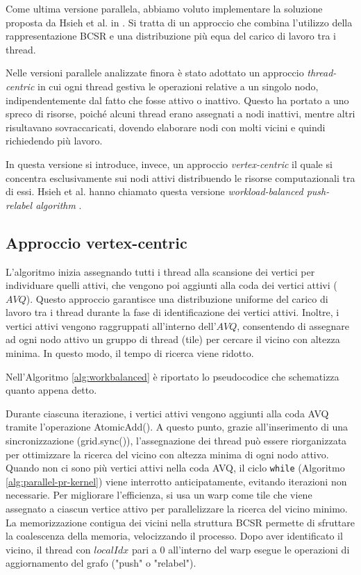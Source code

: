         Come ultima versione parallela, abbiamo voluto implementare la soluzione proposta da Hsieh et al. in \cite{EngineeringWorkload2024}. Si tratta di un approccio che combina l'utilizzo della rappresentazione BCSR e una distribuzione più equa del carico di lavoro tra i thread.

        Nelle versioni parallele analizzate finora è stato adottato un approccio \textit{thread-centric} in cui ogni thread gestiva le operazioni relative a un singolo nodo, indipendentemente dal fatto che fosse attivo o inattivo. Questo ha portato a uno spreco di risorse, poiché alcuni thread erano assegnati a nodi inattivi, mentre altri risultavano sovraccaricati, dovendo elaborare nodi con molti vicini e quindi richiedendo più lavoro.

        In questa versione si introduce, invece, un approccio \textit{vertex-centric} il quale si concentra esclusivamente sui nodi attivi distribuendo le risorse computazionali tra di essi. Hsieh et al. hanno chiamato questa versione \textit{workload-balanced push-relabel algorithm} \cite{EngineeringWorkload2024}.

        \subsection{Approccio vertex-centric}
            
            L'algoritmo inizia assegnando tutti i thread alla scansione dei vertici per individuare quelli attivi, che vengono poi aggiunti alla coda dei vertici attivi ($AVQ$). Questo approccio garantisce una distribuzione uniforme del carico di lavoro tra i thread durante la fase di identificazione dei vertici attivi. Inoltre, i vertici attivi vengono raggruppati all'interno dell'$AVQ$, consentendo di assegnare ad ogni nodo attivo un gruppo di thread (tile) per cercare il vicino con altezza minima. In questo modo, il tempo di ricerca viene ridotto.

            Nell'Algoritmo \ref{alg:workbalanced} è riportato lo pseudocodice che schematizza quanto appena detto. 
            
            Durante ciascuna iterazione, i vertici attivi vengono aggiunti alla coda AVQ tramite l'operazione AtomicAdd(). A questo punto, grazie all'inserimento di una sincronizzazione (grid.sync()), l'assegnazione dei thread può essere riorganizzata per ottimizzare la ricerca del vicino con altezza minima di ogni nodo attivo. Quando non ci sono più vertici attivi nella coda AVQ, il ciclo \verb|while| (Algoritmo \ref{alg:parallel-pr-kernel}) viene interrotto anticipatamente, evitando iterazioni non necessarie. Per migliorare l'efficienza, si usa un warp come tile che viene assegnato a ciascun vertice attivo per parallelizzare la ricerca del vicino minimo. La memorizzazione contigua dei vicini nella struttura BCSR permette di sfruttare la coalescenza della memoria, velocizzando il processo. Dopo aver identificato il vicino, il thread con $localIdx$ pari a 0 all'interno del warp esegue le operazioni di aggiornamento del grafo ("push" o "relabel").
            
